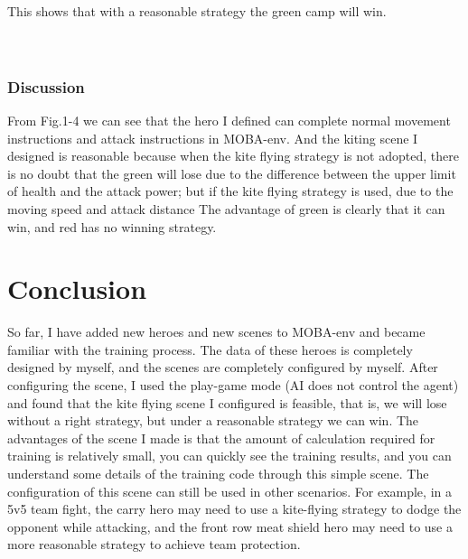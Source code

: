 \documentclass[runningheads]{llncs}
\begin{document}
This shows that with a reasonable strategy the green camp will win. \\ \\ \\

\subsubsection{Discussion}
From Fig.1-4 we can see that the hero I defined can complete normal movement instructions and attack instructions in MOBA-env. And the kiting scene I designed is reasonable because when the kite flying strategy is not adopted, there is no doubt that the green will lose due to the difference between the upper limit of health and the attack power; but if the kite flying strategy is used, due to the moving speed and attack distance The advantage of green is clearly that it can win, and red has no winning strategy.


\section{Conclusion}
\qquad So far, I have added new heroes and new scenes to MOBA-env and became familiar with the training process. The data of these heroes is completely designed by myself, and the scenes are completely configured by myself. After configuring the scene, I used the play-game mode (AI does not control the agent) and found that the kite flying scene I configured is feasible, that is, we will lose without a right strategy, but under a reasonable strategy we can win. The advantages of the scene I made is that the amount of calculation required for training is relatively small, you can quickly see the training results, and you can understand some details of the training code through this simple scene. The configuration of this scene can still be used in other scenarios. For example, in a 5v5 team fight, the carry hero may need to use a kite-flying strategy to dodge the opponent while attacking, and the front row meat shield hero may need to use a more reasonable strategy to achieve team protection.\\ \\ \\
\end{document}
